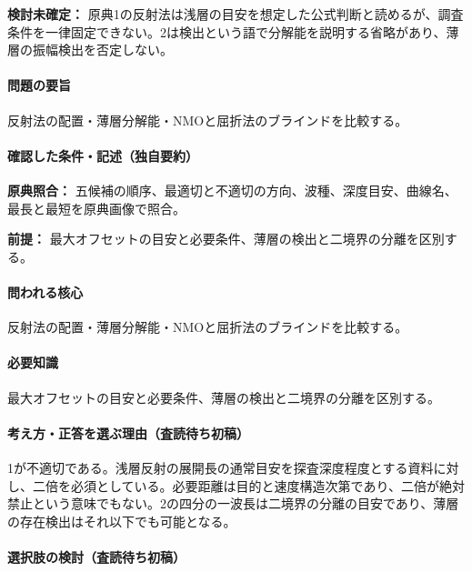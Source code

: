 \par\textbf{検討未確定：} 原典1の反射法は浅層の目安を想定した公式判断と読めるが、調査条件を一律固定できない。2は検出という語で分解能を説明する省略があり、薄層の振幅検出を否定しない。

\paragraph{問題の要旨} 反射法の配置・薄層分解能・NMOと屈折法のブラインドを比較する。

\paragraph{確認した条件・記述（独自要約）}\mbox{}\par

\noindent\textbf{原典照合：} 五候補の順序、最適切と不適切の方向、波種、深度目安、曲線名、最長と最短を原典画像で照合。\par

\noindent\textbf{前提：} 最大オフセットの目安と必要条件、薄層の検出と二境界の分離を区別する。\par

\paragraph{問われる核心} 反射法の配置・薄層分解能・NMOと屈折法のブラインドを比較する。

\paragraph{必要知識} 最大オフセットの目安と必要条件、薄層の検出と二境界の分離を区別する。

\paragraph{考え方・正答を選ぶ理由（査読待ち初稿）} 1が不適切である。浅層反射の展開長の通常目安を探査深度程度とする資料に対し、二倍を必須としている。必要距離は目的と速度構造次第であり、二倍が絶対禁止という意味でもない。2の四分の一波長は二境界の分離の目安であり、薄層の存在検出はそれ以下でも可能となる。

\paragraph{選択肢の検討（査読待ち初稿）}\mbox{}\par

